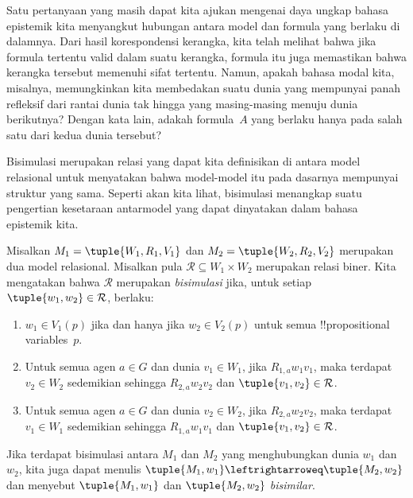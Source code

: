 \documentclass[../../../include/open-logic-section]{subfiles}
\begin{document}


Satu pertanyaan yang masih dapat kita ajukan mengenai daya ungkap bahasa
epistemik kita menyangkut hubungan antara model dan formula yang berlaku di
dalamnya. Dari hasil korespondensi kerangka, kita telah melihat bahwa jika
formula tertentu valid dalam suatu kerangka, formula itu juga memastikan
bahwa kerangka tersebut memenuhi sifat tertentu. Namun, apakah bahasa modal
kita, misalnya, memungkinkan kita membedakan suatu dunia yang mempunyai
panah refleksif dari rantai dunia tak hingga yang masing-masing menuju dunia
berikutnya? Dengan kata lain, adakah formula~$A$ yang berlaku hanya pada salah
satu dari kedua dunia tersebut?

Bisimulasi merupakan relasi yang dapat kita definisikan di antara model
relasional untuk menyatakan bahwa model-model itu pada dasarnya mempunyai
struktur yang sama. Seperti akan kita lihat, bisimulasi menangkap suatu
pengertian kesetaraan antarmodel yang dapat dinyatakan dalam bahasa epistemik
kita.

\begin{defn}[Bisimulasi]
Misalkan $M_1=\tuple{W_1,R_1,V_1}$ dan $M_2=\tuple{W_2,R_2,V_2}$ merupakan
dua model relasional. Misalkan pula $\mathcal{R}\subseteq W_1\times W_2$
merupakan relasi biner. Kita mengatakan bahwa $\mathcal{R}$ merupakan
\emph{bisimulasi} jika, untuk setiap
$\tuple{w_1,w_2}\in\mathcal{R}$, berlaku:

\begin{enumerate}
  \item $w_1\in V_1(p)$ jika dan hanya jika $w_2\in V_2(p)$ untuk semua
    !!{propositional variable}s~$p$.
  \item Untuk semua agen $a\in G$ dan dunia $v_1\in W_1$, jika
    $R_{1,a}w_1v_1$, maka terdapat $v_2\in W_2$ sedemikian sehingga
    $R_{2,a}w_2v_2$ dan $\tuple{v_1,v_2}\in\mathcal{R}$.
  \item Untuk semua agen $a\in G$ dan dunia $v_2\in W_2$, jika
    $R_{2,a}w_2v_2$, maka terdapat $v_1\in W_1$ sedemikian sehingga
    $R_{1,a}w_1v_1$ dan $\tuple{v_1,v_2}\in\mathcal{R}$.
\end{enumerate}

Jika terdapat bisimulasi antara $M_1$ dan $M_2$ yang menghubungkan dunia
$w_1$ dan $w_2$, kita juga dapat menulis
$\tuple{M_1,w_1}\leftrightarroweq\tuple{M_2,w_2}$ dan menyebut
$\tuple{M_1,w_1}$ dan $\tuple{M_2,w_2}$ \emph{bisimilar}.
\end{defn}
\end{document}
